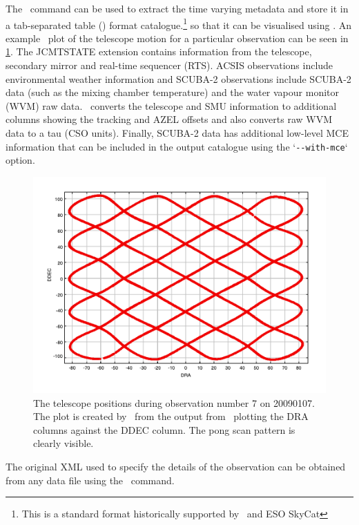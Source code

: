 \documentclass[oneside,11pt]{starlink}
\begin{document}
The \jcmtstate\ command can be used to extract the time varying
metadata and store it in a tab-separated table
() format catalogue.\footnote{This is a
  standard format historically supported by \cursa\ and ESO SkyCat} so
that it can be visualised using \topcat. An example \topcat\ plot of the
telescope motion for a particular observation can be seen in
\ref{fig:topcat}. The JCMTSTATE extension contains information from
the telescope, secondary mirror and real-time sequencer (RTS). ACSIS
observations include environmental weather information and SCUBA-2
observations include SCUBA-2 data (such as the mixing chamber
temperature) and the water vapour monitor (WVM) raw data. \jcmtstate\
converts the telescope and SMU information to additional columns
showing the tracking and AZEL offsets and also converts raw WVM data
to a tau (CSO units). Finally, SCUBA-2 data has additional low-level
MCE information that can be included in the output catalogue using the
`\verb+--with-mce+` option.

\begin{figure}
\begin{center}
\includegraphics[width=1\textwidth]{sun258_scan_pattern}
\caption{The telescope positions during observation number 7 on
  20090107. The plot is created by \topcat\ from the output from
\jcmtstate\ plotting the DRA columns against the DDEC column. The pong
scan pattern is clearly visible.}
\label{fig:topcat}
\end{center}
\end{figure}

The original XML used to specify the details of the observation can be
obtained from any data file using the \dumpocscfg\ command.
\end{document}
